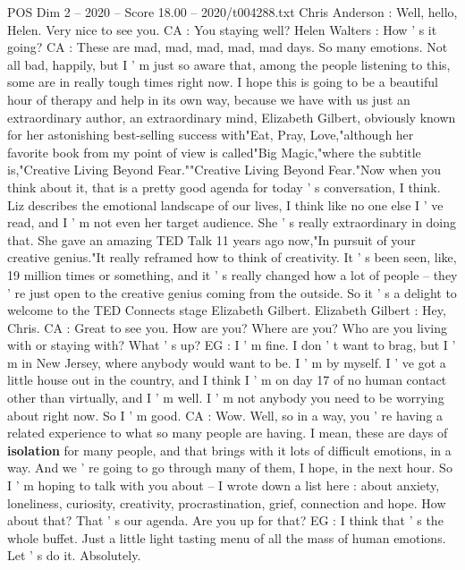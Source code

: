 \begin{textsample}{POS Dim 2 – 2020 – Score 18.00 – 2020/t004288.txt}  \label{ex:f2_pos_013}
Chris Anderson : Well, hello, Helen.
Very nice to see you.
CA : You staying well?
Helen Walters : How ' s it going?
CA : These are mad, mad, mad, mad, mad days.
So many emotions.
Not all bad, happily, but I ' m just so aware that, among the people listening to this, some are in really tough times right now.
I hope this is going to be a beautiful hour of therapy and help in its own way, because we have with us just an extraordinary author, an extraordinary mind, Elizabeth Gilbert, obviously known for her astonishing best-selling success with"Eat, Pray, Love,"although her favorite book from my point of view is called"Big Magic,"where the subtitle is,"Creative Living Beyond Fear.""Creative Living Beyond Fear."Now when you think about it, that is a pretty good agenda for today ' s conversation, I think.
Liz describes the emotional landscape of our lives, I think like no one else I ' ve read, and I ' m not even her target audience.
She ' s really extraordinary in doing that.
She gave an amazing TED Talk 11 years ago now,"In pursuit of your creative genius."It really reframed how to think of creativity.
It ' s been seen, like, 19 million times or something, and it ' s really changed how a lot of people -- they ' re just open to the creative genius coming from the outside.
So it ' s a delight to welcome to the TED Connects stage Elizabeth Gilbert.
Elizabeth Gilbert : Hey, Chris.
CA : Great to see you.
How are you?
Where are you?
Who are you living with or staying with?
What ' s up?
EG : I ' m fine.
I don ' t want to brag, but I ' m in New Jersey, where anybody would want to be.
I ' m by myself.
I ' ve got a little house out in the country, and I think I ' m on day 17 of no human contact other than virtually, and I ' m well.
I ' m not anybody you need to be worrying about right now.
So I ' m good.
CA : Wow.
Well, so in a way, you ' re having a related experience to what so many people are having.
I mean, these are days of \textbf{isolation} for many people, and that brings with it lots of difficult emotions, in a way.
And we ' re going to go through many of them, I hope, in the next hour.
So I ' m hoping to talk with you about -- I wrote down a list here : about anxiety, loneliness, curiosity, creativity, procrastination, grief, connection and hope.
How about that?
That ' s our agenda.
Are you up for that?
EG : I think that ' s the whole buffet.
Just a little light tasting menu of all the mass of human emotions.
Let ' s do it.
Absolutely.

\end{textsample}
